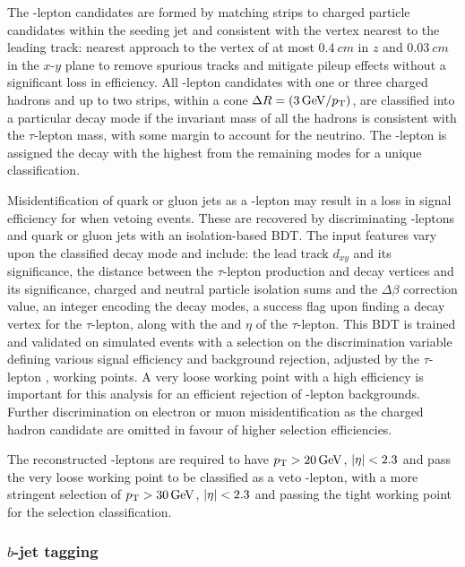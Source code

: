 The \Ptauh-lepton candidates are formed by matching strips to charged particle candidates within the seeding jet and consistent with the vertex nearest to the leading track: nearest approach to the vertex of at most $\SI{0.4}{cm}$ in $z$ and $\SI{0.03}{cm}$ in the $x$-$y$ plane to remove spurious tracks and mitigate pileup effects without a significant loss in efficiency. All \Ptauh-lepton candidates with one or three charged hadrons and up to two strips, within a cone $\Delta R=(\SI{3}{GeV}/p_{\text{T}})$, are classified into a particular decay mode if the invariant mass of all the hadrons is consistent with the $\tau$-lepton mass, with some margin to account for the neutrino. The \Ptauh-lepton is assigned the decay with the highest \pt from the remaining modes for a unique classification.

Misidentification of quark or gluon jets as a \Ptauh-lepton may result in a loss in signal efficiency for \IZvvj when vetoing \Ptauh events. These are recovered by discriminating \Ptauh-leptons and quark or gluon jets with an isolation-based BDT. The input features vary upon the classified decay mode and include: the lead track $d_{xy}$ and its significance, the distance between the $\tau$-lepton production and decay vertices and its significance, charged and neutral particle isolation sums and the $\Delta\beta$ correction value, an integer encoding the decay modes, a success flag upon finding a decay vertex for the $\tau$-lepton, along with the \pt and $\eta$ of the $\tau$-lepton. This BDT is trained and validated on simulated events with a selection on the discrimination variable defining various signal efficiency and background rejection, adjusted by the $\tau$-lepton \pt, working points. A very loose working point with a high efficiency is important for this analysis for an efficient rejection of \Ptauh-lepton backgrounds. Further discrimination on electron or muon misidentification as the charged hadron candidate are omitted in favour of higher selection efficiencies.

The reconstructed \Ptauh-leptons are required to have ${p_{\text{T}}>\SI{20}{GeV}}$, ${|\eta|<2.3}$ and pass the very loose working point to be classified as a veto \Ptauh-lepton, with a more stringent selection of ${p_{\text{T}}>\SI{30}{GeV}}$, ${|\eta|<2.3}$ and passing the tight working point for the selection classification.

\subsubsection{$b$-jet tagging}

